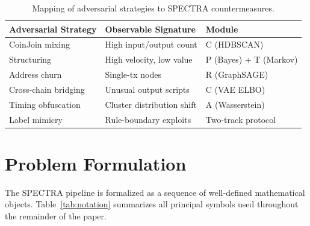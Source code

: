 \documentclass[journal]{IEEEtran}
\newcommand{\spectra}{\textsc{SPECTRA}}
\begin{document}
\begin{table}[t]
  \renewcommand{\arraystretch}{1.15}
  \caption{Mapping of adversarial strategies to \spectra{} countermeasures.}
  \label{tab:threat_summary}
  \centering
  \small
  \begin{tabular}{@{}p{2.1cm}p{2.3cm}p{2.3cm}@{}}
    \toprule
    \textbf{Adversarial Strategy} & \textbf{Observable Signature} & \textbf{Module} \\
    \midrule
    CoinJoin mixing       & High input/output count & C (HDBSCAN) \\
    Structuring           & High velocity, low value & P (Bayes) + T (Markov) \\
    Address churn         & Single-tx nodes & R (GraphSAGE) \\
    Cross-chain bridging  & Unusual output scripts & C (VAE ELBO) \\
    Timing obfuscation    & Cluster distribution shift & A (Wasserstein) \\
    Label mimicry         & Rule-boundary exploits & Two-track protocol \\
    \bottomrule
  \end{tabular}
\end{table}

\FloatBarrier
\section{Problem Formulation}
\label{sec:problem}

The \textsc{SPECTRA} pipeline is formalized as a sequence of well-defined
mathematical objects.  Table~\ref{tab:notation} summarizes all principal
symbols used throughout the remainder of the paper.
\end{document}
